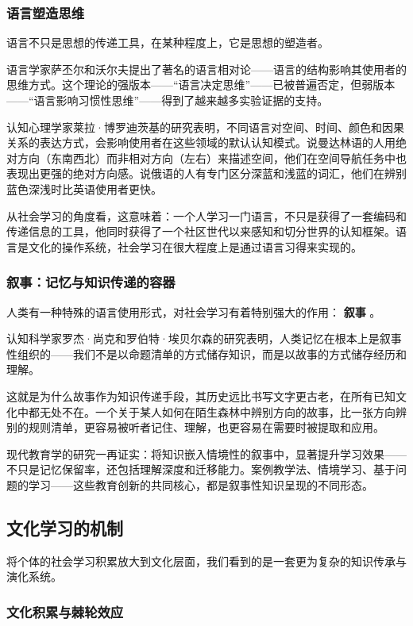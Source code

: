 \documentclass[11pt]{article}
\begin{document}
\subsubsection{语言塑造思维}
\label{sec:org43e3032}

语言不只是思想的传递工具，在某种程度上，它是思想的塑造者。

语言学家萨丕尔和沃尔夫提出了著名的语言相对论——语言的结构影响其使用者的思维方式。这个理论的强版本——“语言决定思维”——已被普遍否定，但弱版本——“语言影响习惯性思维”——得到了越来越多实验证据的支持。

认知心理学家莱拉·博罗迪茨基的研究表明，不同语言对空间、时间、颜色和因果关系的表达方式，会影响使用者在这些领域的默认认知模式。说曼达林语的人用绝对方向（东南西北）而非相对方向（左右）来描述空间，他们在空间导航任务中也表现出更强的绝对方向感。说俄语的人有专门区分深蓝和浅蓝的词汇，他们在辨别蓝色深浅时比英语使用者更快。

从社会学习的角度看，这意味着：一个人学习一门语言，不只是获得了一套编码和传递信息的工具，他同时获得了一个社区世代以来感知和切分世界的认知框架。语言是文化的操作系统，社会学习在很大程度上是通过语言习得来实现的。
\subsubsection{叙事：记忆与知识传递的容器}
\label{sec:orgcfaa0e6}

人类有一种特殊的语言使用形式，对社会学习有着特别强大的作用： \textbf{叙事} 。

认知科学家罗杰·尚克和罗伯特·埃贝尔森的研究表明，人类记忆在根本上是叙事性组织的——我们不是以命题清单的方式储存知识，而是以故事的方式储存经历和理解。

这就是为什么故事作为知识传递手段，其历史远比书写文字更古老，在所有已知文化中都无处不在。一个关于某人如何在陌生森林中辨别方向的故事，比一张方向辨别的规则清单，更容易被听者记住、理解，也更容易在需要时被提取和应用。

现代教育学的研究一再证实：将知识嵌入情境性的叙事中，显著提升学习效果——不只是记忆保留率，还包括理解深度和迁移能力。案例教学法、情境学习、基于问题的学习——这些教育创新的共同核心，都是叙事性知识呈现的不同形态。
\subsection{文化学习的机制}
\label{sec:org8865083}

将个体的社会学习积累放大到文化层面，我们看到的是一套更为复杂的知识传承与演化系统。
\subsubsection{文化积累与棘轮效应}
\label{sec:orgdaac005}
\end{document}
